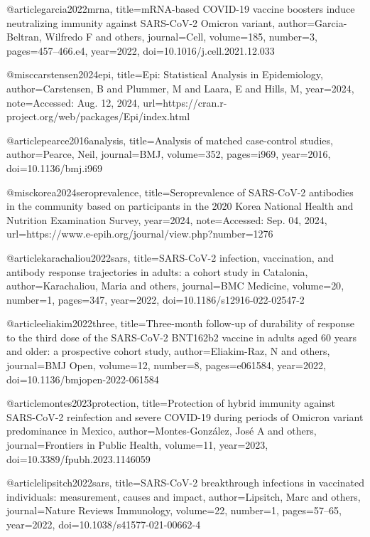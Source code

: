 @article{garcia2022mrna,
	title={mRNA-based COVID-19 vaccine boosters induce neutralizing immunity against SARS-CoV-2 Omicron variant},
	author={Garcia-Beltran, Wilfredo F and others},
	journal={Cell},
	volume={185},
	number={3},
	pages={457--466.e4},
	year={2022},
	doi={10.1016/j.cell.2021.12.033}
}

@misc{carstensen2024epi,
	title={Epi: Statistical Analysis in Epidemiology},
	author={Carstensen, B and Plummer, M and Laara, E and Hills, M},
	year={2024},
	note={Accessed: Aug. 12, 2024},
	url={https://cran.r-project.org/web/packages/Epi/index.html}
}

@article{pearce2016analysis,
	title={Analysis of matched case-control studies},
	author={Pearce, Neil},
	journal={BMJ},
	volume={352},
	pages={i969},
	year={2016},
	doi={10.1136/bmj.i969}
}

@misc{korea2024seroprevalence,
	title={Seroprevalence of SARS-CoV-2 antibodies in the community based on participants in the 2020 Korea National Health and Nutrition Examination Survey},
	year={2024},
	note={Accessed: Sep. 04, 2024},
	url={https://www.e-epih.org/journal/view.php?number=1276}
}

@article{karachaliou2022sars,
	title={SARS-CoV-2 infection, vaccination, and antibody response trajectories in adults: a cohort study in Catalonia},
	author={Karachaliou, Maria and others},
	journal={BMC Medicine},
	volume={20},
	number={1},
	pages={347},
	year={2022},
	doi={10.1186/s12916-022-02547-2}
}

@article{eliakim2022three,
	title={Three-month follow-up of durability of response to the third dose of the SARS-CoV-2 BNT162b2 vaccine in adults aged 60 years and older: a prospective cohort study},
	author={Eliakim-Raz, N and others},
	journal={BMJ Open},
	volume={12},
	number={8},
	pages={e061584},
	year={2022},
	doi={10.1136/bmjopen-2022-061584}
}

@article{montes2023protection,
	title={Protection of hybrid immunity against SARS-CoV-2 reinfection and severe COVID-19 during periods of Omicron variant predominance in Mexico},
	author={Montes-Gonz{\'a}lez, Jos{\'e} A and others},
	journal={Frontiers in Public Health},
	volume={11},
	year={2023},
	doi={10.3389/fpubh.2023.1146059}
}

@article{lipsitch2022sars,
	title={SARS-CoV-2 breakthrough infections in vaccinated individuals: measurement, causes and impact},
	author={Lipsitch, Marc and others},
	journal={Nature Reviews Immunology},
	volume={22},
	number={1},
	pages={57--65},
	year={2022},
	doi={10.1038/s41577-021-00662-4}
}

